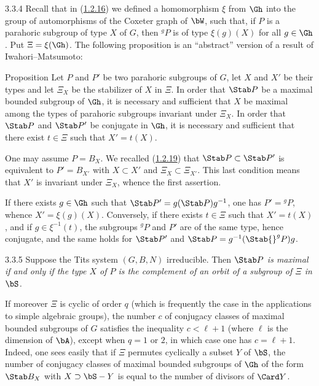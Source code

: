 \documentclass[12pt,a4paper,oneside,english]{smfart}
\makeatletter
\newcommand{\btanchor}[1]{\leavevmode\Hy@raisedlink{\hypertarget{bt:#1}{}}}
\newcommand{\btref}[1]{\hyperlink{bt:#1}{#1}}
\theoremstyle{definition}
\theoremstyle{bt}
\makeatother
\begin{document}
\num{3.3.4}\btanchor{3.3.4}
Recall that in (\btref{1.2.16}) we defined a homomorphism $\xi$ from $\Gh$ into the
group of automorphisms of the Coxeter graph of $\bW$, such that, if $P$ is a
parahoric subgroup of type $X$ of $G$, then ${}^{g}P$ is of type $\xi(g)(X)$
for all $g\in\Gh$. Put $\Xi = \xi(\Gh)$. The following proposition is an
``abstract'' version of a result of Iwahori--Matsumoto:

\begin{states}{Proposition}
Let $P$ and $P'$ be two parahoric subgroups of $G$, let $X$ and $X'$ be their
types and let $\Xi_X$ be the stabilizer of $X$ in $\Xi$. In order that
$\Stab P$ be a maximal bounded subgroup of $\Gh$, it is necessary and
sufficient that $X$ be maximal among the types of parahoric subgroups
invariant under $\Xi_X$. In order that $\Stab P$ and $\Stab P'$ be conjugate
in $\Gh$, it is necessary and sufficient that there exist $t\in\Xi$ such that
$X' = t(X)$.
\end{states}

One may assume $P = B_X$. We recalled (\btref{1.2.19}) that
$\Stab P \subset \Stab P'$ is equivalent to $P' = B_{X'}$ with
$X \subset X'$ and $\Xi_X \subset \Xi_{X'}$. This last condition means that
$X'$ is invariant under $\Xi_X$, whence the first assertion.

If there exists $g\in\Gh$ such that $\Stab P' = g(\Stab P)g^{-1}$, one has
$P' = {}^{g}P$, whence $X' = \xi(g)(X)$. Conversely, if there exists
$t\in\Xi$ such that $X' = t(X)$, and if $g \in \xi^{-1}(t)$, the subgroups
${}^{g}P$ and $P'$ are of the same type, hence conjugate, and the same holds
for $\Stab P'$ and $\Stab P = g^{-1}(\Stab {}^{g}P)g$.

\num{3.3.5}\btanchor{3.3.5}
Suppose the Tits system $(G,B,N)$ irreducible. Then \emph{$\Stab P$ is
maximal if and only if the type $X$ of $P$ is the complement of an orbit of a
subgroup of $\Xi$ in $\bS$.}

If moreover $\Xi$ is cyclic of order $q$ (which is frequently the case in the
applications to simple algebraic groups), the number $c$ of conjugacy classes
of maximal bounded subgroups of $G$ satisfies the inequality $c < \ell + 1$
(where $\ell$ is the dimension of $\bA$), except when $q = 1$ or $2$, in
which case one has $c = \ell + 1$. Indeed, one sees easily that if $\Xi$
permutes cyclically a subset $Y$ of $\bS$, the number of conjugacy classes of
maximal bounded subgroups of $\Gh$ of the form $\Stab B_X$ with
$X \supset \bS - Y$ is equal to the number of divisors of $\Card Y$.
\end{document}
